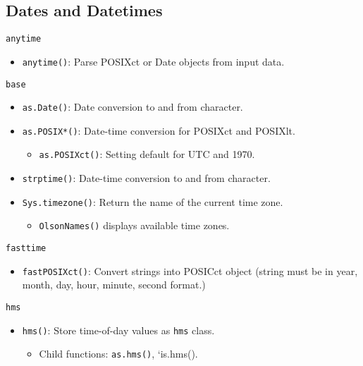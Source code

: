 \documentclass[]{book}
\providecommand{\tightlist}{%
  \setlength{\itemsep}{0pt}\setlength{\parskip}{0pt}}
\theoremstyle{definition}
\theoremstyle{definition}
\theoremstyle{definition}
\theoremstyle{remark}
\begin{document}
\subsection{Dates and Datetimes}\label{dates-and-datetimes}

\texttt{anytime}

\begin{itemize}
\tightlist
\item
  \texttt{anytime()}: Parse POSIXct or Date objects from input data.
\end{itemize}

\texttt{base}

\begin{itemize}
\tightlist
\item
  \texttt{as.Date()}: Date conversion to and from character.
\item
  \texttt{as.POSIX*()}: Date-time conversion for POSIXct and POSIXlt.

  \begin{itemize}
  \tightlist
  \item
    \texttt{as.POSIXct()}: Setting default for UTC and 1970.
  \end{itemize}
\item
  \texttt{strptime()}: Date-time conversion to and from character.
\item
  \texttt{Sys.timezone()}: Return the name of the current time zone.

  \begin{itemize}
  \tightlist
  \item
    \texttt{OlsonNames()} displays available time zones.
  \end{itemize}
\end{itemize}

\texttt{fasttime}

\begin{itemize}
\tightlist
\item
  \texttt{fastPOSIXct()}: Convert strings into POSICct object (string
  must be in year, month, day, hour, minute, second format.)
\end{itemize}

\texttt{hms}

\begin{itemize}
\tightlist
\item
  \texttt{hms()}: Store time-of-day values as \texttt{hms} class.

  \begin{itemize}
  \tightlist
  \item
    Child functions: \texttt{as.hms()}, `is.hms().
  \end{itemize}
\end{itemize}
\end{document}
